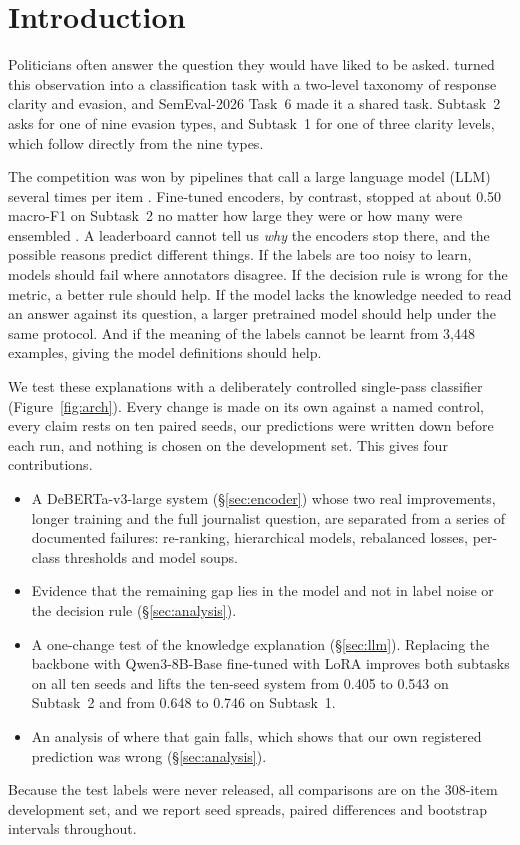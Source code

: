 \section{Introduction}
\label{sec:intro}
\FigureArch

Politicians often answer the question they would have liked to be asked.
\citet{thomas-etal-2024-never} turned this observation into a classification task with a two-level taxonomy of response clarity and evasion, and SemEval-2026 Task~6 \citep{thomas-etal-2026-semeval} made it a shared task.
Subtask~2 asks for one of nine evasion types, and Subtask~1 for one of three clarity levels, which follow directly from the nine types.

The competition was won by pipelines that call a large language model (LLM) several times per item \citep{shi-etal-2026-teleai,peerachaidecho-rutherford-2026-chulanlp}.
Fine-tuned encoders, by contrast, stopped at about 0.50 macro-F1 on Subtask~2 no matter how large they were or how many were ensembled \citep{thomas-etal-2026-semeval}.
A leaderboard cannot tell us \emph{why} the encoders stop there, and the possible reasons predict different things.
If the labels are too noisy to learn, models should fail where annotators disagree.
If the decision rule is wrong for the metric, a better rule should help.
If the model lacks the knowledge needed to read an answer against its question, a larger pretrained model should help under the same protocol.
And if the meaning of the labels cannot be learnt from 3,448 examples, giving the model definitions should help.

We test these explanations with a deliberately controlled single-pass classifier (Figure~\ref{fig:arch}).
Every change is made on its own against a named control, every claim rests on ten paired seeds, our predictions were written down before each run, and nothing is chosen on the development set.
This gives four contributions.
\begin{itemize}
  \item A DeBERTa-v3-large system (\S\ref{sec:encoder}) whose two real improvements, longer training and the full journalist question, are separated from a series of documented failures: re-ranking, hierarchical models, rebalanced losses, per-class thresholds and model soups.
  \item Evidence that the remaining gap lies in the model and not in label noise or the decision rule (\S\ref{sec:analysis}).
  \item A one-change test of the knowledge explanation (\S\ref{sec:llm}). Replacing the backbone with Qwen3-8B-Base fine-tuned with LoRA \citep{qwen3,hu2022lora} improves both subtasks on all ten seeds and lifts the ten-seed system from 0.405 to 0.543 on Subtask~2 and from 0.648 to 0.746 on Subtask~1.
  \item An analysis of where that gain falls, which shows that our own registered prediction was wrong (\S\ref{sec:analysis}).
\end{itemize}
Because the test labels were never released, all comparisons are on the 308-item development set, and we report seed spreads, paired differences and bootstrap intervals throughout.
